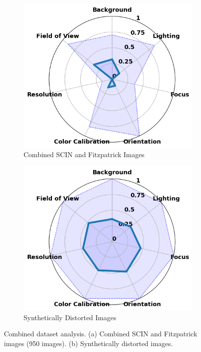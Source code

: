 \clearpage
\begin{figure}[ht]
    \centering
    \begin{subfigure}[b]{0.48\textwidth}
        \includegraphics[width=\textwidth]{img/hept/combined.png}
        \caption{Combined SCIN and Fitzpatrick Images}
        \label{fig:combined}
    \end{subfigure}
    \hfill
    \begin{subfigure}[b]{0.48\textwidth}
        \includegraphics[width=\textwidth]{img/hept/comb_synthetic.png}
        \caption{Synthetically Distorted Images}
        \label{fig:comb_synthetic}
    \end{subfigure}
    \hfill
    \caption{Combined dataset analysis. (a) Combined SCIN and Fitzpatrick images (950 images). (b) Synthetically distorted images.}
    \label{fig:CF}
\end{figure}
\clearpage
